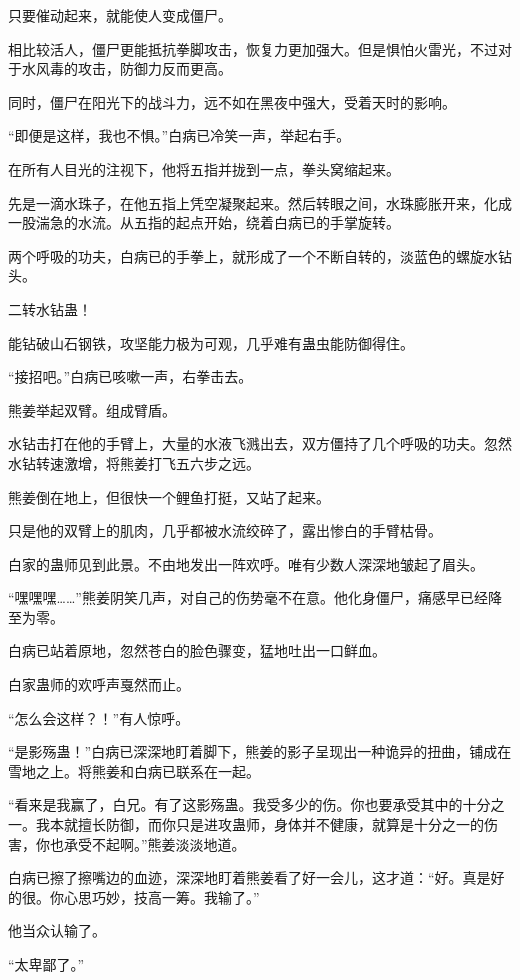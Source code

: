 \begin{this_body}
只要催动起来，就能使人变成僵尸。

相比较活人，僵尸更能抵抗拳脚攻击，恢复力更加强大。但是惧怕火雷光，不过对于水风毒的攻击，防御力反而更高。

同时，僵尸在阳光下的战斗力，远不如在黑夜中强大，受着天时的影响。

“即便是这样，我也不惧。”白病已冷笑一声，举起右手。

在所有人目光的注视下，他将五指并拢到一点，拳头窝缩起来。

先是一滴水珠子，在他五指上凭空凝聚起来。然后转眼之间，水珠膨胀开来，化成一股湍急的水流。从五指的起点开始，绕着白病已的手掌旋转。

两个呼吸的功夫，白病已的手拳上，就形成了一个不断自转的，淡蓝色的螺旋水钻头。

二转水钻蛊！

能钻破山石钢铁，攻坚能力极为可观，几乎难有蛊虫能防御得住。

“接招吧。”白病已咳嗽一声，右拳击去。

熊姜举起双臂。组成臂盾。

水钻击打在他的手臂上，大量的水液飞溅出去，双方僵持了几个呼吸的功夫。忽然水钻转速激增，将熊姜打飞五六步之远。

熊姜倒在地上，但很快一个鲤鱼打挺，又站了起来。

只是他的双臂上的肌肉，几乎都被水流绞碎了，露出惨白的手臂枯骨。

白家的蛊师见到此景。不由地发出一阵欢呼。唯有少数人深深地皱起了眉头。

“嘿嘿嘿……”熊姜阴笑几声，对自己的伤势毫不在意。他化身僵尸，痛感早已经降至为零。

白病已站着原地，忽然苍白的脸色骤变，猛地吐出一口鲜血。

白家蛊师的欢呼声戛然而止。

“怎么会这样？！”有人惊呼。

“是影殇蛊！”白病已深深地盯着脚下，熊姜的影子呈现出一种诡异的扭曲，铺成在雪地之上。将熊姜和白病已联系在一起。

“看来是我赢了，白兄。有了这影殇蛊。我受多少的伤。你也要承受其中的十分之一。我本就擅长防御，而你只是进攻蛊师，身体并不健康，就算是十分之一的伤害，你也承受不起啊。”熊姜淡淡地道。

白病已擦了擦嘴边的血迹，深深地盯着熊姜看了好一会儿，这才道：“好。真是好的很。你心思巧妙，技高一筹。我输了。”

他当众认输了。

“太卑鄙了。”


\end{this_body}
